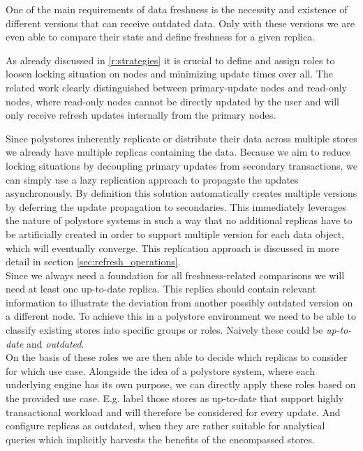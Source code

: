One of the main requirements of data freshness is the necessity and existence of different versions that can receive outdated data. 
Only with these versions we are even able to compare their state and define freshness for a given replica.

As already discussed in \ref{r:strategies} it is crucial to define and assign roles to loosen locking situation on nodes
and minimizing update times over all.
The related work clearly distinguished between primary-update nodes and read-only nodes, where 
read-only nodes cannot be directly updated by the user and will only receive refresh updates internally from the primary nodes.

Since polystores inherently replicate or distribute their data across multiple stores we already have multiple replicas containing the data. 
Because we aim to reduce locking situations by decoupling primary updates from secondary transactions,
we can simply use a lazy replication approach to propagate the updates asynchronously. 
By definition this solution automatically creates multiple versions by deferring the update propagation to secondaries.
This immediately leverages the nature of polystore systems in such a way that no additional replicas have to be artificially created in order 
to support multiple version for each data object, which will eventually converge. 
This replication approach is discussed in more detail in section \ref{sec:refresh_operations}.\\


Since we always need a foundation for all freshness-related comparisons we will need at least one up-to-date replica. 
This replica should contain relevant information to illustrate the deviation from another possibly outdated version on a different node.
To achieve this in a polystore environment we need to be able to classify existing stores into specific groups or roles.
Naively these could be \emph{up-to-date} and \emph{outdated}.\\
On the basis of these roles we are then able to decide which replicas to consider for which use case.
Alongside the idea of a polystore system, where each underlying engine has its own purpose, we can directly apply these roles 
based on the provided use case. E.g. label those stores as up-to-date that support highly transactional workload and will therefore be considered for every update.
And configure replicas as outdated, when they are rather suitable for analytical queries which implicitly harvests the benefits of the encompassed stores. \\

